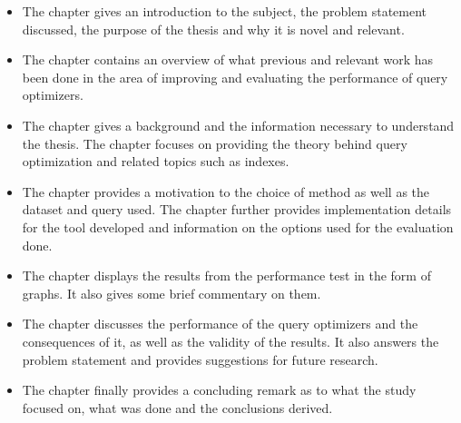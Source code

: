 \begin{itemize}
\item The  chapter gives an introduction to the
  subject, the problem statement discussed, the purpose of
  the thesis and why it is novel and relevant.
\item The  chapter contains an overview of what
  previous and relevant work has been done in the area of improving and
  evaluating the performance of query optimizers.
\item The  chapter gives a background and the information
  necessary to understand the thesis. The chapter focuses on providing the
  theory behind query optimization and related topics such as indexes.
\item The  chapter provides a motivation to the choice of
  method as well as the dataset and query used. The chapter further provides
  implementation details for the tool developed and information on the options
  used for the evaluation done.
\item The  chapter displays the results from the
  performance test in the form of graphs. It also gives some brief commentary on
  them.
\item The  chapter discusses the performance of the
  query optimizers and the consequences of it, as well as the validity of the
  results. It also answers the problem statement and provides suggestions for
  future research.
\item The  chapter finally provides a concluding
  remark as to what the study focused on, what was done and the conclusions
  derived.
\end{itemize}